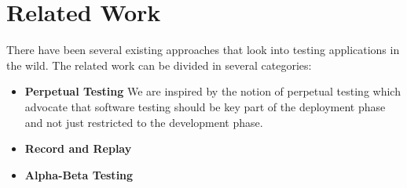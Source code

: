 
\section{Related Work}
\label{sec:related}

There have been several existing approaches that look into testing applications in the wild. 
The related work can be divided in several categories:

\begin{itemize}
  \item \textbf{Perpetual Testing}
    We are inspired by the notion of perpetual testing\cite{perpetual} which advocate that software testing should be key part of the deployment phase and not just restricted to the development phase.
  \item \textbf{Record and Replay}
  \item \textbf{Alpha-Beta Testing}  
\end{itemize}
  


